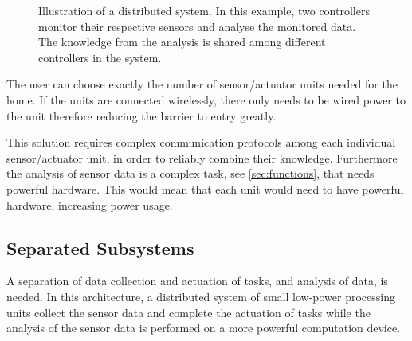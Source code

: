 \begin{figure}[htbp]
\centering
{}
\caption[Distributed system]{Illustration of a distributed system. In this example, two controllers monitor their respective sensors and analyse the monitored data. The knowledge from the analysis is shared among different controllers in the system.}\label{fig:distributed_system}
\end{figure}

The user can choose exactly the number of sensor/actuator units needed for the home. If the units are connected wirelessly, there only needs to be wired power to the unit therefore reducing the barrier to entry greatly.

This solution requires complex communication protocols among each individual sensor/actuator unit, in order to reliably combine their knowledge. Furthermore the analysis of sensor data is a complex task, see \cref{sec:functions}, that needs powerful hardware. This would mean that each unit would need to have powerful hardware, increasing power usage.

\subsection{Separated Subsystems}
A separation of data collection and actuation of tasks, and analysis of data, is needed. In this architecture, a distributed system of small low-power processing units collect the sensor data and complete the actuation of tasks while the analysis of the sensor data is performed on a more powerful computation device.

